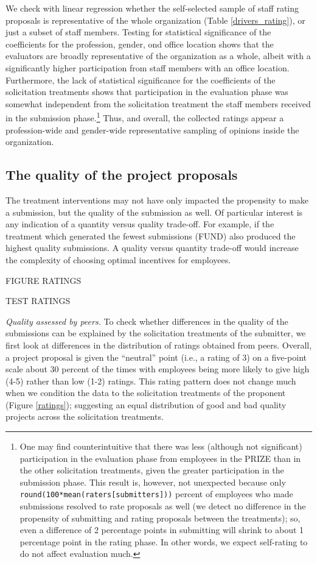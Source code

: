 \documentclass[11pt, titlepage]{article}
\begin{document}
We check with linear regression whether the self-selected sample of
staff rating proposals is representative of the whole organization
(Table \ref{drivers_rating}), or just a subset of staff members. Testing
for statistical significance of the coefficients for the profession,
gender, ond office location shows that the evaluators are broadly
representative of the organization as a whole, albeit with a
significantly higher participation from staff members with an office
location. Furthermore, the lack of statistical significance for the
coefficients of the solicitation treatments shows that participation in
the evaluation phase was somewhat independent from the solicitation
treatment the staff members received in the submission phase.\footnote{One
  may find counterintuitive that there was less (although not
  significant) participation in the evaluation phase from employees in
  the PRIZE than in the other solicitation treatments, given the greater
  participation in the submission phase. This result is, however, not
  unexpected because only
  \texttt{round(100*mean(raters{[}submitters{]}))} percent of employees
  who made submissions resolved to rate proposals as well (we detect no
  difference in the propensity of submitting and rating proposals
  between the treatments); so, even a difference of 2 percentage points
  in submitting will shrink to about 1 percentage point in the rating
  phase. In other words, we expect self-rating to do not affect
  evaluation much.} Thus, and overall, the collected ratings appear a
profession-wide and gender-wide representative sampling of opinions
inside the organization.

\subsection{The quality of the project
proposals}\label{the-quality-of-the-project-proposals}

The treatment interventions may not have only impacted the propensity to
make a submission, but the quality of the submission as well. Of
particular interest is any indication of a quantity versus quality
trade-off. For example, if the treatment which generated the fewest
submissions (FUND) also produced the highest quality submissions. A
quality versus quantity trade-off would increase the complexity of
choosing optimal incentives for employees.

FIGURE RATINGS

TEST RATINGS

\emph{Quality assessed by peers.} To check whether differences in the
quality of the submissions can be explained by the solicitation
treatments of the submitter, we first look at differences in the
distribution of ratings obtained from peers. Overall, a project proposal
is given the ``neutral'' point (i.e., a rating of 3) on a five-point
scale about 30 percent of the times with employees being more likely to
give high (4-5) rather than low (1-2) ratings. This rating pattern does
not change much when we condition the data to the solicitation
treatments of the proponent (Figure \ref{ratings}); suggesting an equal
distribution of good and bad quality projects across the solicitation
treatments.
\end{document}
